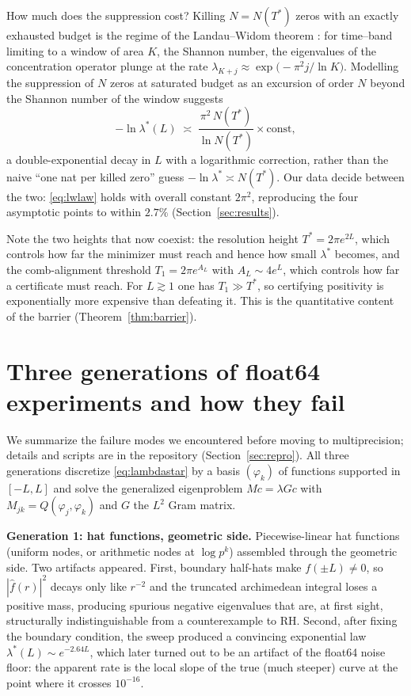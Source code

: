 ﻿\documentclass[11pt]{article}
\newcommand{\lmin}{\lambda^{*}}
\newcommand{\Tstar}{T^{*}}
\newcommand{\fhat}{\hat f}
\begin{document}
How much does the suppression cost?  Killing $N=N(\Tstar)$ zeros with
an exactly exhausted budget is the regime of the Landau--Widom theorem
\cite{LandauWidom1980}: for time--band limiting to a window of area
$K$, the Shannon number, the eigenvalues of the concentration operator
plunge at the rate $\lambda_{K+j}\approx\exp\bigl(-\pi^{2}j/\ln K\bigr)$.
Modelling the suppression of $N$ zeros at saturated budget as an
excursion of order $N$ beyond the Shannon number of the window
suggests
\begin{equation}\label{eq:lwlaw}
  -\ln\lmin(L)\;\asymp\;\frac{\pi^{2}\,N(\Tstar)}{\ln N(\Tstar)}
  \times\text{const},
\end{equation}
a double-exponential decay in $L$ with a logarithmic correction, rather
than the naive ``one nat per killed zero'' guess
$-\ln\lmin\asymp N(\Tstar)$.  Our data decide between the two:
\eqref{eq:lwlaw} holds with overall constant $2\pi^{2}$, reproducing
the four asymptotic points to within $2.7\%$
(Section~\ref{sec:results}).

Note the two heights that now coexist: the resolution height
$\Tstar=2\pi e^{2L}$, which controls how far the minimizer must reach
and hence how small $\lmin$ becomes, and the comb-alignment threshold
$T_1=2\pi e^{A_L}$ with $A_L\sim4e^L$, which controls how far a
certificate must reach.  For $L\gtrsim1$ one has $T_1\gg\Tstar$, so
certifying positivity is exponentially more expensive than defeating
it.  This is the quantitative content of the barrier
(Theorem~\ref{thm:barrier}).

\section{Three generations of float64 experiments and how they fail}
\label{sec:failures}

We summarize the failure modes we encountered before moving to
multiprecision; details and scripts are in the repository
(Section~\ref{sec:repro}).  All three generations discretize
\eqref{eq:lambdastar} by a basis $(\varphi_k)$ of functions supported
in $[-L,L]$ and solve the generalized eigenproblem $Mc=\lambda Gc$
with $M_{jk}=Q(\varphi_j,\varphi_k)$ and $G$ the $L^2$ Gram matrix.

\textbf{Generation 1: hat functions, geometric side.}  Piecewise-linear
hat functions (uniform nodes, or arithmetic nodes at $\log p^k$)
assembled through the geometric side.  Two artifacts appeared.  First,
boundary half-hats make $f(\pm L)\ne0$, so $|\fhat(r)|^2$ decays only
like $r^{-2}$ and the truncated archimedean integral loses a positive
mass, producing spurious negative eigenvalues that are, at first
sight, structurally indistinguishable from a counterexample to RH.
Second, after fixing the boundary condition, the sweep produced a
convincing exponential law $\lmin(L)\sim e^{-2.64 L}$, which later
turned out to be an artifact of the float64 noise floor: the apparent
rate is the local slope of the true (much steeper) curve at the point
where it crosses $10^{-16}$.
\end{document}
